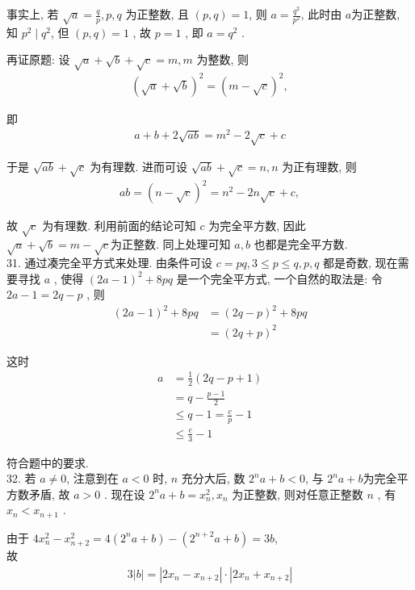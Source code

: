 事实上, 若 $\sqrt{a}=\frac{q}{p}, p ,  q$ 为正整数, 且 $(p, q)=1$, 则 $a=\frac{q^{2}}{p^{2}}$, 此时由 $a$为正整数, 知 $p^{2} \mid q^{2}$, 但 $(p, q)=1$ , 故 $p=1$ , 即 $a=q^{2}$ .

再证原题: 设 $\sqrt{a}+\sqrt{b}+\sqrt{c}=m, m$ 为整数, 则
\begin{align*}
	(\sqrt{a}+\sqrt{b})^{2}=(m-\sqrt{c})^{2},
\end{align*}

即
\begin{align*}
	a+b+2 \sqrt{a b}=m^{2}-2 \sqrt{c}+c
\end{align*}

于是 $\sqrt{a b}+\sqrt{c}$ 为有理数. 进而可设 $\sqrt{a b}+\sqrt{c}=n, n$ 为正有理数, 则
\begin{align*}
	a b=(n-\sqrt{c})^{2}=n^{2}-2 n \sqrt{c}+c,
\end{align*}

故 $\sqrt{c}$ 为有理数. 利用前面的结论可知 $c$ 为完全平方数, 因此 $\sqrt{a}+\sqrt{b}=m-\sqrt{c}$为正整数. 同上处理可知 $a ,  b$ 也都是完全平方数. \\
31. 通过凑完全平方式来处理. 由条件可设 $c=p q, 3 \leqslant p \leqslant q, p ,  q$ 都是奇数, 现在需要寻找 $a$ , 使得 $(2 a-1)^{2}+8 p q$ 是一个完全平方式, 一个自然的取法是: 令 $2 a-1=2 q-p$ , 则\begin{align}
	(2 a-1)^{2}+8 p q & =(2 q-p)^{2}+8 p q \\
	                  & =(2 q+p)^{2}
\end{align}

这时\begin{align}
	a & =\frac{1}{2}(2 q-p+1)       \\
	  & =q-\frac{p-1}{2}            \\
	  & \leqslant q-1=\frac{c}{p}-1 \\
	  & \leqslant \frac{c}{3}-1
\end{align}

符合题中的要求.\\
32. 若 $a \neq 0$, 注意到在 $a<0$ 时, $n$ 充分大后, 数 $2^{n} a+b<0$, 与 $2^{n} a+b$为完全平方数矛盾, 故 $a>0$ . 现在设 $2^{n} a+b=x_{n}^{2}, x_{n}$ 为正整数, 则对任意正整数 $n$ , 有 $x_{n}<x_{n+1}$ .

由于 $4 x_{n}^{2}-x_{n+2}^{2}=4\left(2^{n} a+b\right)-\left(2^{n+2} a+b\right)=3 b$,\\
故
\begin{align*}
	3|b|=\left|2 x_{n}-x_{n+2}\right| \cdot\left|2 x_{n}+x_{n+2}\right|
\end{align*}

